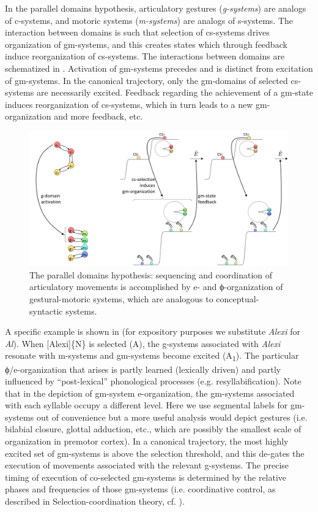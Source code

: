   In the parallel domains hypothesis, articulatory gestures (\textit{g-systems}) are analogs of c-systems, and motoric systems (\textit{m-systems}) are analogs of s-systems. The interaction between domains is such that selection of cs-systems drives organization of gm-systems, and this creates states which through feedback induce reorganization of cs-systems. The interactions between domains are schematized in {}. Activation of gm-systems precedes and is distinct from excitation of gm-systems. In the canonical trajectory, only the gm-domains of selected cs-systems are necessarily excited. Feedback regarding the achievement of a gm-state induces reorganization of cs-systems, which in turn leads to a new gm-organization and more feedback, etc.

  
\begin{figure}
\includegraphics[width=\textwidth]{figures/Tilsen-img54.png}
\caption{The parallel domains hypothesis: sequencing and coordination of articulatory movements is accomplished by e- and ϕ-organization of gestural-motoric systems, which are analogous to conceptual-syntactic systems.}
\label{fig:4:4}
\end{figure}
 

  A specific example is shown in {} (for expository purposes we substitute \textit{Alexi} for \textit{Al}). When [Alexi]\{N\} is selected (A), the g-systems associated with \textit{Alexi} resonate with m-systems and gm-systems become excited (A\textsubscript{1}). The particular ϕ/e-organization that arises is partly learned (lexically driven) and partly influenced by “post-lexical” phonological processes (e.g. resyllabification). Note that in the depiction of gm-system e-organization, the gm-systems associated with each syllable occupy a different level. Here we use segmental labels for gm-systems out of convenience but a more useful analysis would depict gestures (i.e. bilabial closure, glottal adduction, etc., which are possibly the smallest scale of organization in premotor cortex). In a canonical trajectory, the most highly excited set of gm-systems is above the selection threshold, and this de-gates the execution of movements associated with the relevant g-systems. The precise timing of execution of co-selected gm-systems is determined by the relative phases and frequencies of those gm-systems (i.e. coordinative control, as described in Selection-coordination theory, cf. \citealt{Tilsen2016,Tilsen2018}). 

